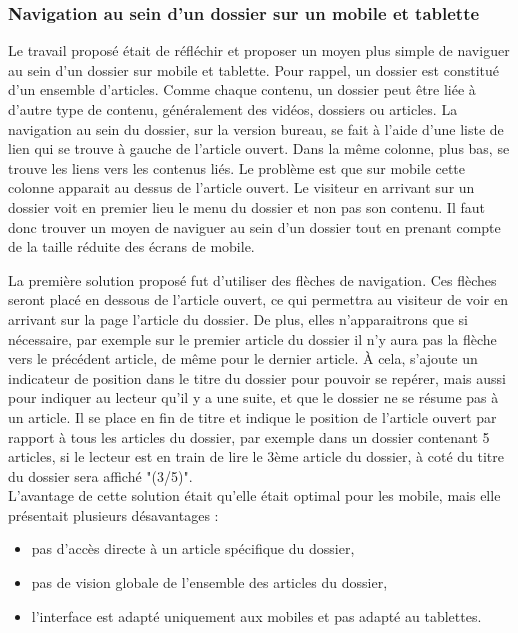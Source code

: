 \documentclass[12pt,a4paper]{article}
\begin{document}
\subsubsection{Navigation au sein d'un dossier sur un mobile et tablette}
Le travail proposé était de réfléchir et proposer un moyen plus simple de naviguer au sein d'un dossier sur mobile et tablette. Pour rappel, un dossier est constitué d'un ensemble d'articles. Comme chaque contenu, un dossier peut être liée à d'autre type de contenu, généralement des vidéos, dossiers ou articles. La navigation au sein du dossier, sur la version bureau, se fait à l'aide d'une liste de lien qui se trouve à gauche de l'article ouvert. Dans la même colonne, plus bas, se trouve les liens vers les contenus liés. Le problème est que sur mobile cette colonne apparait au dessus de l'article ouvert. Le visiteur en arrivant sur un dossier voit en premier lieu le menu du dossier et non pas son contenu. Il faut donc trouver un moyen de naviguer au sein d'un dossier tout en prenant compte de la taille réduite des écrans de mobile.\par
La première solution proposé fut d'utiliser des flèches de navigation. Ces flèches seront placé en dessous de l'article ouvert, ce qui permettra au visiteur de voir en arrivant sur la page l'article du dossier. De plus, elles n'apparaitrons que si nécessaire, par exemple sur le premier article du dossier il n'y aura pas la flèche vers le précédent article, de même pour le dernier article. À cela, s'ajoute un indicateur de position dans le titre du dossier pour pouvoir se repérer, mais aussi pour indiquer au lecteur qu'il y a une suite, et que le dossier ne se résume pas à un article. Il se place en fin de titre et indique le position de l'article ouvert par rapport à tous les articles du dossier, par exemple dans un dossier contenant 5 articles, si le lecteur est en train de lire le 3ème article du dossier, à coté du titre du dossier sera affiché "(3/5)".\\
L'avantage de cette solution était qu'elle était optimal pour les mobile, mais elle présentait plusieurs désavantages :
\begin{itemize}
\item pas d'accès directe à un article spécifique du dossier,
\item pas de vision globale de l'ensemble des articles du dossier,
\item l'interface est adapté uniquement aux mobiles et pas adapté au tablettes.
\end{itemize}\par
\end{document}
